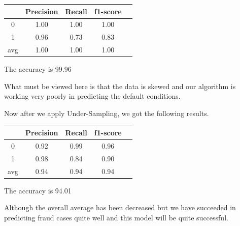 \begin{center}
\begin{tabular}{| c | c | c | c | c |}
\hline
    & Precision & Recall & f1-score \\
\hline
0 & 1.00 & 1.00 & 1.00 \\
\hline
1 & 0.96 & 0.73 & 0.83 \\
\hline
avg & 1.00 & 1.00 & 1.00 \\
\hline
\end{tabular}
\end{center}
\begin{center}
The accuracy is 99.96%
\end{center}
\par What must be viewed here is that the data is skewed and our algorithm is working very poorly in predicting the default conditions.
\par Now after we apply Under-Sampling, we got the following results.

\begin{center}
\begin{tabular}{| c | c | c | c | c |}
\hline
    & Precision & Recall & f1-score \\
\hline
0 & 0.92 & 0.99 & 0.96 \\
\hline
1 & 0.98 & 0.84 & 0.90 \\
\hline
avg & 0.94 & 0.94 & 0.94 \\
\hline
\end{tabular}
\end{center}
\begin{center}
The accuracy is 94.01%
\end{center}
Although the overall average has been decreased but we have succeeded in predicting fraud cases quite well and this model will be quite successful.

